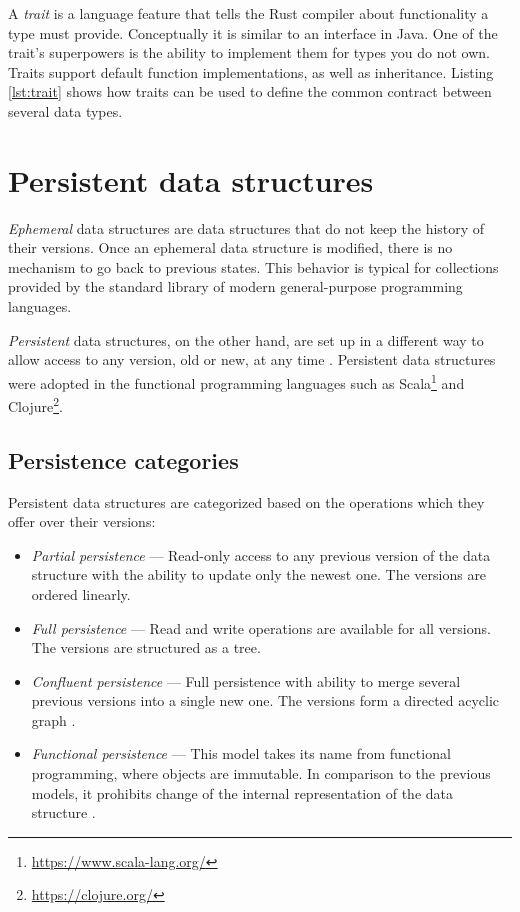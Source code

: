 A \emph{trait} is a language feature that tells the Rust compiler about functionality a type must provide. Conceptually it is similar to an interface in Java. One of the trait's superpowers is the ability to implement them for types you do not own. Traits support default function implementations, as well as inheritance. Listing \ref{lst:trait} shows how traits can be used to define the common contract between several data types.

\section{Persistent data structures}
\label{sec:psds}

\emph{Ephemeral} data structures are data structures that do not keep the history of their versions. Once an ephemeral data structure is modified, there is no mechanism to go back to previous states. This behavior is typical for collections provided by the standard library of modern general-purpose programming languages.

\emph{Persistent} data structures, on the other hand, are set up in a different way to allow access to any version, old or new, at any time \cite{making-data-structures-persistent}. Persistent data structures were adopted in the functional programming languages such as Scala\footnote{\url{https://www.scala-lang.org/}} and Clojure\footnote{\url{https://clojure.org/}}.

\subsection{Persistence categories}
Persistent data structures are categorized based on the operations which they offer over their versions:
\begin{itemize}
    \item \textit{Partial persistence} --- Read-only access to any previous version of the data structure with the ability to update only the newest one. The versions are ordered linearly.
    \item \textit{Full persistence} --- Read and write operations are available for all versions. The versions are structured as a tree.
    \item \textit{Confluent persistence} --- Full persistence with ability to merge several previous versions into a single new one. The versions form a directed acyclic graph \cite{fully-persistent-lists-with-catenation}.
    \item \textit{Functional persistence} --- This model takes its name from functional programming, where objects are immutable. In comparison to the previous models, it prohibits change of the internal representation of the data structure \cite{purely-functional-data-structures}.
\end{itemize}

